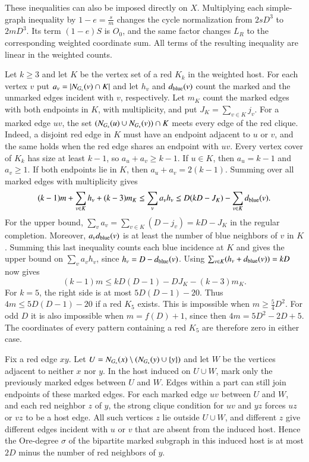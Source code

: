 These inequalities can also be imposed directly on $X$. Multiplying
each simple-graph inequality by $1-e=\frac{s}{m}$ changes the cycle
normalization from $2sD^3$ to $2mD^3$. Its term $(1-e)S$ is $O_0$,
and the same factor changes $L_R$ to the corresponding weighted
coordinate sum. All terms of the resulting inequality are linear
in the weighted counts.

Let $k\geq3$ and let $K$ be the vertex set of a red $K_k$ in the weighted host.
For each vertex $v$ put $a_v=|N_{G_{\rm s}}(v)\cap K|$ and let
$h_v$ and $d_{\rm blue}(v)$ count the marked and the unmarked edges
incident with $v$, respectively. Let $m_K$ count the marked edges with
both endpoints in $K$, with multiplicity, and put
$J_K=\sum_{v\in K}j_v$. For a marked edge $uv$, the set
$(N_{G_{\rm s}}(u)\cup N_{G_{\rm s}}(v))\cap K$ meets every edge
of the red clique. Indeed, a disjoint red edge in $K$ must have an
endpoint adjacent to $u$ or $v$, and the same holds when the red
edge shares an endpoint with $uv$. Every vertex cover of $K_k$ has
size at least $k-1$, so $a_u+a_v\geq k-1$. If $u\in K$, then
$a_u=k-1$ and $a_v\geq1$. If both endpoints lie in $K$, then
$a_u+a_v=2(k-1)$. Summing over all marked edges with multiplicity gives
\[
 (k-1)m+\sum_{v\in K}h_v+(k-3)m_K
 \le\sum_v a_vh_v
 \le D(kD-J_K)-\sum_{v\in K}d_{\rm blue}(v).
\]
For the upper bound, $\sum_v a_v=\sum_{v\in K}(D-j_v)=kD-J_K$
in the regular completion. Moreover, $a_vd_{\rm blue}(v)$ is at
least the number of blue neighbors of $v$ in $K$. Summing this
last inequality counts each blue incidence at $K$ and gives the
upper bound on $\sum_v a_vh_v$, since $h_v=D-d_{\rm blue}(v)$.
Using $\sum_{v\in K}(h_v+d_{\rm blue}(v))=kD$ now gives
\[
 (k-1)m\le kD(D-1)-DJ_K-(k-3)m_K.
\]
For $k=5$, the right side is at most $5D(D-1)-20$. Thus $4m\leq5D(D-1)-20$ if a red $K_5$ exists.
This is impossible when $m\geq\frac54D^2$. For odd $D$ it is also
impossible when $m=f(D)+1$, since then $4m=5D^2-2D+5$.
The coordinates of every pattern containing a red $K_5$ are
therefore zero in either case.

Fix a red edge $xy$. Let $U=N_{G_{\rm s}}(x)\setminus (N_{G_{\rm s}}(y)\cup\{y\})$
and let $W$ be the vertices adjacent to neither $x$ nor $y$. In the
host induced on $U\cup W$, mark only the previously marked edges
between $U$ and $W$. Edges within a part can still join endpoints of
these marked edges. For each marked edge $uv$ between $U$ and $W$, and
each red neighbor $z$ of $y$, the strong clique condition for $uv$
and $yz$ forces $uz$ or $vz$ to be a host edge. All such vertices $z$ lie
outside $U\cup W$, and different $z$ give different edges incident
with $u$ or $v$ that are absent from the induced host. Hence the Ore-degree $\sigma$ of the bipartite
marked subgraph in this induced host is at most $2D$ minus the
number of red neighbors of $y$.

